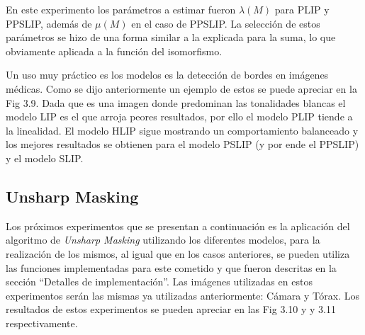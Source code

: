 En este experimento los par\'ametros a estimar fueron $\lambda(M)$ para PLIP y PPSLIP, adem\'as de $\mu(M)$ en el caso de PPSLIP. La selecci\'on de estos par\'ametros se hizo de una forma similar a la explicada para la suma, lo que obviamente aplicada a la funci\'on del isomorfismo.

Un uso muy pr\'actico es los modelos es la detecci\'on de bordes en im\'agenes m\'edicas. Como se dijo anteriormente un ejemplo de estos se puede apreciar en la Fig 3.9. Dada que es una imagen donde predominan las tonalidades blancas el modelo LIP es el que arroja peores resultados, por ello el modelo PLIP tiende a la linealidad. El modelo HLIP sigue mostrando un comportamiento balanceado y los mejores resultados se obtienen para el modelo PSLIP (y por ende el PPSLIP) y el modelo SLIP.

\subsection{Unsharp Masking}

Los pr\'oximos experimentos que se presentan a continuaci\'on es la aplicaci\'on del algoritmo de \textit{Unsharp Masking} utilizando los diferentes modelos, para la realizaci\'on de los mismos, al igual que en los casos anteriores, se pueden utiliza las funciones implementadas para este cometido y que fueron descritas en la secci\'on ``Detalles de implementaci\'on''. Las im\'agenes utilizadas en estos experimentos ser\'an las mismas ya utilizadas anteriormente: C\'amara y T\'orax. Los resultados de estos experimentos se pueden apreciar en las Fig 3.10 y y 3.11 respectivamente.

